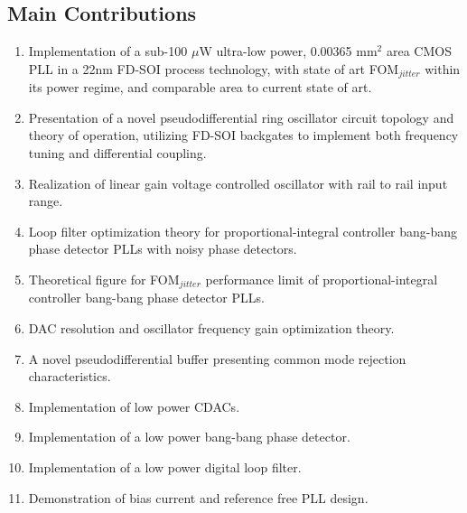 \vspace{1em}

\subsection{Main Contributions}
\begin{enumerate}[itemsep=0pt,label=\protect\mycirc{\arabic*}]
	\setlength\itemsep{-0.8em}
	\item Implementation of a sub-100 $\mu$W ultra-low power, 0.00365 mm$^2$ area CMOS PLL in a 22nm FD-SOI process technology, with state of art FOM$_{jitter}$ within its power regime, and comparable area to current state of art.
	\item Presentation of a novel pseudodifferential ring oscillator circuit topology and theory of operation, utilizing FD-SOI backgates to implement both frequency tuning and differential coupling.
	\item Realization of linear gain voltage controlled oscillator with rail to rail input range. 
	\item Loop filter optimization theory for proportional-integral controller bang-bang phase detector PLLs with noisy phase detectors.
	\item Theoretical figure for FOM$_{jitter}$ performance limit of proportional-integral controller bang-bang phase detector PLLs.
	\item DAC resolution and oscillator frequency gain optimization theory.
	\item A novel pseudodifferential buffer presenting common mode rejection characteristics.
	\item Implementation of low power CDACs.
	\item Implementation of a low power bang-bang phase detector.
	\item Implementation of a low power digital loop filter.
	\item Demonstration of bias current and reference free PLL design.
\end{enumerate}
